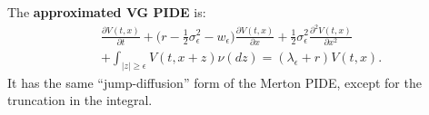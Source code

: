 \documentclass[a4paper,10pt]{article}
\begin{document}
The \textbf{approximated VG PIDE} is:
\begin{align}\label{VG_JD}
&  \frac{\partial V(t,x)}{\partial t} +
 \bigl( r-\frac{1}{2}\sigma_{\epsilon}^2 - w_{\epsilon} \bigr) \frac{\partial V(t,x)}{\partial x} 
 + \frac{1}{2}\sigma_{\epsilon}^2 \frac{\partial^2 V(t,x)}{\partial x^2} \\ \nonumber
 &+ \int_{|z| \geq \epsilon} V(t,x+z) \nu(dz) = (\lambda_{\epsilon} + r) V(t,x).
\end{align}
It has the same ``jump-diffusion'' form of the Merton PIDE, except for the truncation in the integral.






\end{document}
